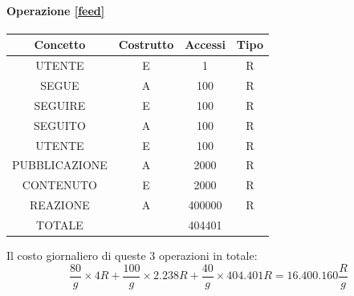 \documentclass[a4paper,12pt]{report}
\begin{document}
\begin{table}[H]
\paragraph{Operazione \ref{feed}\newline}
\begin{tabular}{|c|c|c|c|}
\hline
Concetto      & Costrutto & Accessi & Tipo \\ \hline
UTENTE        & E         & 1       & R    \\ \hline
SEGUE         & A         & 100     & R    \\ \hline
SEGUIRE       & E         & 100     & R    \\ \hline
SEGUITO       & A         & 100     & R    \\ \hline
UTENTE        & E         & 100     & R    \\ \hline
PUBBLICAZIONE & A         & 2000    & R    \\ \hline
CONTENUTO     & E         & 2000    & R    \\ \hline
REAZIONE      & A         & 400000  & R    \\ \hline
TOTALE        &           & 404401  &      \\ \hline
\end{tabular}
\end{table}
Il costo giornaliero di queste 3 operazioni in totale:
\begin{equation}
  \frac{80} g \times 4 R + \frac{100} g \times 2.238 R + \frac{40} g \times 404.401 R = 16.400.160 \frac{R} g 
\end{equation}
\end{document}
